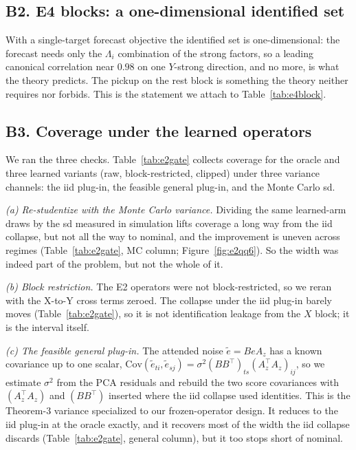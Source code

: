 \documentclass[11pt]{article}
\begin{document}
\subsection*{B2. E4 blocks: a one-dimensional identified set}
With a single-target forecast objective the identified set is one-dimensional: the forecast needs
only the $\Lambda_i$ combination of the strong factors, so a leading canonical correlation near
$0.98$ on one $Y$-strong direction, and no more, is what the theory predicts. The pickup on the rest
block is something the theory neither requires nor forbids. This is the statement we attach to
Table~\ref{tab:e4block}.

\subsection*{B3. Coverage under the learned operators}
We ran the three checks. Table~\ref{tab:e2gate} collects coverage for the oracle and three learned
variants (raw, block-restricted, clipped) under three variance channels: the iid plug-in, the
feasible general plug-in, and the Monte Carlo sd.

\emph{(a) Re-studentize with the Monte Carlo variance.} Dividing the same learned-arm draws by the
sd measured in simulation lifts coverage a long way from the iid collapse, but not all the way to
nominal, and the improvement is uneven across regimes (Table~\ref{tab:e2gate}, MC column;
Figure~\ref{fig:e2qq6}). So the width was indeed part of the problem, but not the whole of it.

\emph{(b) Block restriction.} The E2 operators were not block-restricted, so we reran with the
X-to-Y cross terms zeroed. The collapse under the iid plug-in barely moves
(Table~\ref{tab:e2gate}), so it is not identification leakage from the $X$ block; it is the interval
itself.

\emph{(c) The feasible general plug-in.} The attended noise $\widetilde e=B e A_z$ has a known
covariance up to one scalar, $\mathrm{Cov}(\widetilde e_{ti},\widetilde e_{sj})=
\sigma^2 (BB^\top)_{ts}(A_z^\top A_z)_{ij}$, so we estimate $\sigma^2$ from the PCA residuals and
rebuild the two score covariances with $(A_z^\top A_z)$ and $(BB^\top)$ inserted where the iid
collapse used identities. This is the Theorem-3 variance specialized to our frozen-operator design.
It reduces to the iid plug-in at the oracle exactly, and it recovers most of the width the iid
collapse discards (Table~\ref{tab:e2gate}, general column), but it too stops short of nominal.
\end{document}
